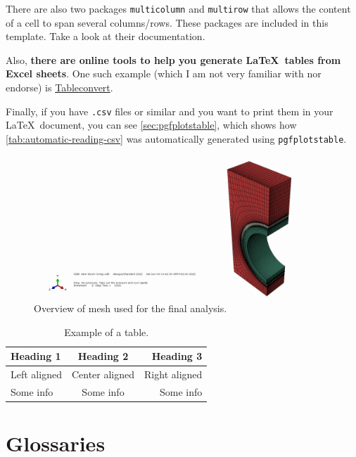 \begin{description}
	There are also two packages \verb|multicolumn| and \verb|multirow| that allows the content of a cell to span several columns/rows. These packages are included in this template. Take a look at their documentation.

	Also, \textbf{there are online tools to help you generate \LaTeX\ tables from Excel sheets}. One such example (which I am not very familiar with nor endorse) is \href{https://tableconvert.com/excel-to-latex}{Tableconvert}.

	Finally, if you have \texttt{.csv} files or similar and you want to print them in your \LaTeX\ document, you can see \cref{sec:pgfplotstable}, which shows how \cref{tab:automatic-reading-csv} was automatically generated using \verb|pgfplotstable|.
\end{description}

\begin{figure}[h]
	\centering %
	\includegraphics[keepaspectratio, trim = 1050 12 150 30, clip, width=0.5\linewidth, height=0.3\textheight]{Images/monoblock-material-overview-mesh.png}
	\caption[Overview of  mesh used for the final analysis.]{Overview of  mesh used for the final analysis.}
	\label{fig:monoblock-overview-mesh}
\end{figure}

\begin{table}[h]
	\centering %
	\begin{tabular}{lcr}
	  \toprule
	  Heading 1 & Heading 2 & Heading 3 \\
	  \midrule
	  Left aligned & Center aligned & Right aligned \\
	  \cmidrule{2-3} %
	  Some info & Some info & Some info \\
	  \bottomrule
	\end{tabular}
	\caption{Example of a table.}
	\label{tab:example-table}
\end{table}

\FloatBarrier

\section{Glossaries}\label{sec:glossaries}


